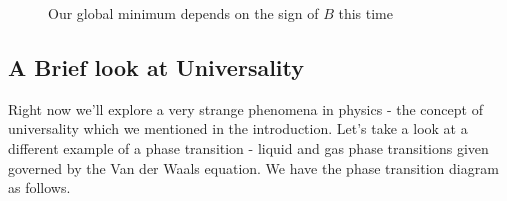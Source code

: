\documentclass[11pt, oneside]{article}   	%
\begin{document}
\begin{figure}[h]
\centering
{} 
\quad
{}

\caption{Our global minimum depends on the sign of $B$ this time} 

\end{figure} 

\subsection{A Brief look at Universality} 
Right now we'll explore a very strange phenomena in physics - the concept of universality which we mentioned in the introduction. Let's take a look at a different example of a phase transition - liquid and gas phase transitions given governed by the Van der Waals equation. We have the phase transition diagram as follows. 
\end{document}
